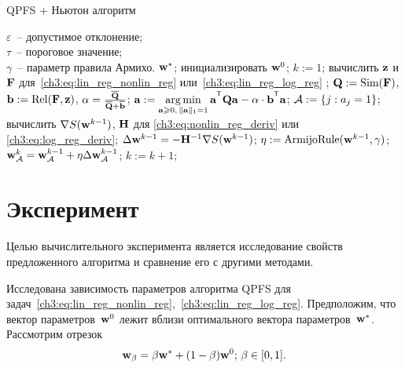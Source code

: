 \begin{algorithm}
	\caption{QPFS + Ньютон алгоритм}
	\label{pc:QPFSNewton}
	\begin{algorithmic}
		\REQUIRE $\varepsilon$~-- допустимое отклонение;\\
		\hspace{1.07cm}$\tau$~-- пороговое значение;\\
		\hspace{1.07cm}$\gamma$~-- параметр правила Армихо.
		\ENSURE $\mathbf{w}^*$;
		\STATE  инициализировать $\mathbf{w}^0$;
		\STATE $k := 1$;
		\REPEAT
		\STATE вычислить $\mathbf{z}$ и $\mathbf{F}$ для~\eqref{ch3:eq:lin_reg_nonlin_reg} или~\eqref{ch3:eq:lin_reg_log_reg} ;
		\vspace{0.1cm}
		\STATE $\mathbf{Q} := \text{Sim} (\mathbf{F})$, $\mathbf{b} := \text{Rel}(\mathbf{F}, \mathbf{z})$, $\alpha = \frac{\overline{\mathbf{Q}}}{\overline{\mathbf{Q}} + \overline{\mathbf{b}}}$;
		\vspace{0.1cm}
		\STATE $\ba := \argmin_{\ba \geq 0, \, \|\ba\|_1=1}\ba^{\T} \bQ \ba - \alpha \cdot \mathbf{b}^{\T} \ba$;
		\vspace{0.1cm}
		\STATE $\mathcal{A} := \{j: a_j = 1\}$;
		\vspace{0.1cm}
		\STATE вычислить $\nabla S(\mathbf{w}^{k-1})$, $\mathbf{H}$ для \eqref{ch3:eq:nonlin_reg_deriv} или \eqref{ch3:eq:log_reg_deriv};
		\vspace{0.1cm}
		\STATE $\Delta \mathbf{w}^{k-1} = - \mathbf{H}^{-1} \nabla S(\mathbf{w}^{k-1})$;
		\vspace{0.1cm}
		\STATE $\eta := \text{ArmijoRule}(\mathbf{w}^{k-1}, \gamma)$;
		\vspace{0.1cm}
		\STATE $\mathbf{w}_{\mathcal{A}}^k = \mathbf{w}_{\mathcal{A}}^{k - 1} + \eta \Delta \mathbf{w}_{\mathcal{A}}^{k - 1}$;
		\vspace{0.1cm}
		\STATE $k := k + 1$;
		\vspace{0.1cm}
	\end{algorithmic}
\end{algorithm}


  \section*{Эксперимент}
  Целью вычислительного эксперимента является исследование свойств предложенного алгоритма и сравнение его с другими методами. 
  
  Исследована зависимость параметров алгоритма QPFS для задач~\eqref{ch3:eq:lin_reg_nonlin_reg},~\eqref{ch3:eq:lin_reg_log_reg}. 
  Предположим, что вектор параметров~$\mathbf{w}^0$ лежит вблизи оптимального вектора параметров~$\mathbf{w}^*$. 
  Рассмотрим отрезок
\[
\mathbf{w}_{\beta} = \beta \mathbf{w}^* + (1 - \beta) \mathbf{w}^0; \, \beta \in [0, 1] .
\]

